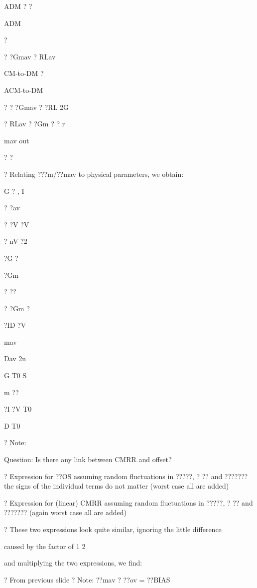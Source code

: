 \documentclass[2pt,landscape]{article}
\begin{document}
\begin{multicols*}{5}
ADM	?
?



ADM


?

? ?Gmav ? 
RLav


CM-to-DM ?






ACM-to-DM


? ? ?Gmav  ? ?RL
2G


?	RLav ? ?Gm ?
? r


mav	out


? ? 



?	Relating ???m/??mav to physical parameters, we obtain:


G	?	, I


? ?av


? ?V ?V


?	nV  ?2



?G	?


?Gm


? ??


?	?Gm ?




?ID	?V




mav


Dav	2n


G	T0	S


m	??


?I	?V	T0


D	T0





?	Note:


Question: Is there any link between CMRR and offset?



?	Expression for ??OS assuming random fluctuations in ?????, ? ?? and ??????? 
the signs of the individual terms do not matter (worst case all are 
added)


?	Expression for (linear) CMRR assuming random fluctuations in ?????, ? ??
and ??????? (again worst case all are added)

?	These two expressions look quite similar, ignoring the little difference


caused by the factor of 1
2


and multiplying the two 
expressions, we find:



?	From previous slide
?	Note: ??mav ? ??ov = ??BIAS




\end{multicols*}
\end{document}
